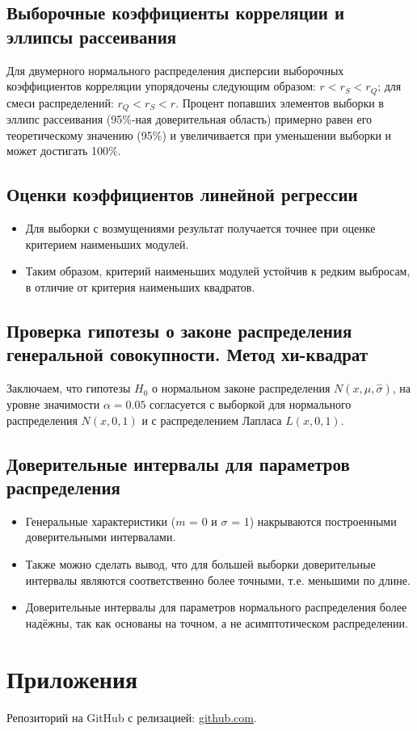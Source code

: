 \documentclass[12pt,a4paper]{scrartcl}
\begin{document}
\subsection{Выборочные коэффициенты корреляции и эллипсы рассеивания}
Для двумерного нормального распределения дисперсии выборочных коэффициентов корреляции упорядочены следующим образом: $r < r_{S} < r_{Q}$; для смеси распределений: $r_{Q} < r_{S} < r$.
\newline
Процент попавших элементов выборки в эллипс рассеивания (95$\%$-ная доверительная область) примерно равен его теоретическому значению (95$\%$) и увеличивается при уменьшении выборки и может достигать 100$\%$.

\subsection{Оценки коэффициентов линейной регрессии}

\begin{itemize}
 наименьших квадратов точнее оценивает коэффициенты линейной регрессии на выборке без возмущений. 
\item
Для выборки с возмущениями результат получается точнее при оценке критерием наименьших модулей.
\item
Таким образом, критерий наименьших модулей устойчив к редким выбросам, в отличие от критерия наименьших квадратов.
\end{itemize}

\subsection{ Проверка гипотезы о законе распределения генеральной совокупности. Метод хи-квадрат}

Заключаем, что гипотезы $H_{0}$ о нормальном законе распределения $N(x,\hat{\mu}, \hat{\sigma})$,  на уровне значимости $\alpha = 0.05$ согласуется с выборкой для нормального распределения $N(x, 0, 1)$ и с распределением Лапласа $L(x, 0, 1)$.

\subsection{Доверительные интервалы для параметров распределения}

\begin{itemize}
    \item Генеральные характеристики ($m$ = 0 и $\sigma$ = 1) накрываются построенными доверительными интервалами. 
    \item Также можно сделать вывод, что для большей выборки доверительные интервалы являются соответственно более точными, т.е. меньшими по длине.
    \item Доверительные интервалы для параметров нормального распределения более надёжны, так как основаны на точном, а не асимптотическом распределении.
\end{itemize}

\section{Приложения}
Репозиторий на GitHub с релизацией: \href{https://github.com/WiillyWonka/MatStat}{github.com}.
\end{document}

